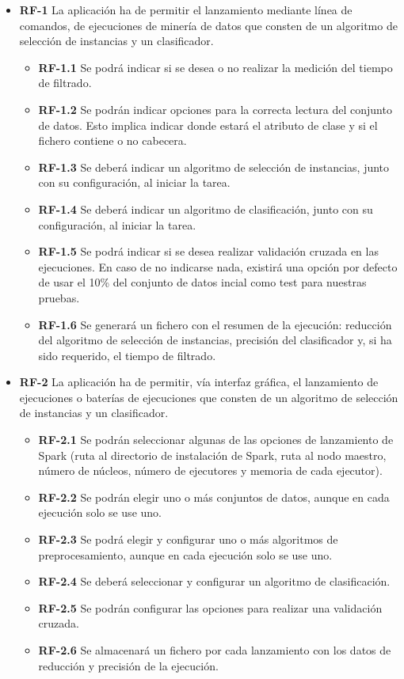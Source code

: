 \begin{itemize}

\item \textbf{RF-1} La aplicación ha de permitir el lanzamiento mediante línea de comandos, de ejecuciones de minería de datos que consten de un algoritmo de selección de instancias y un clasificador.
	\begin{itemize}
		\item \textbf{RF-1.1} Se podrá indicar si se desea o no realizar la medición del tiempo de filtrado.
		\item \textbf{RF-1.2} Se podrán indicar opciones para la correcta lectura del conjunto de datos. Esto implica indicar donde estará el atributo de clase y si el fichero contiene o no cabecera.
		\item \textbf{RF-1.3} Se deberá indicar un algoritmo de selección de instancias, junto con su configuración, al iniciar la tarea.
		\item \textbf{RF-1.4} Se deberá indicar un algoritmo de clasificación, junto con su configuración, al iniciar la tarea.
		\item \textbf{RF-1.5} Se podrá indicar si se desea realizar validación cruzada en las ejecuciones. En caso de no indicarse nada, existirá una opción por defecto de usar el 10\% del conjunto de datos incial como test para nuestras pruebas.
		\item \textbf{RF-1.6} Se generará un fichero con el resumen de la ejecución: reducción del algoritmo de selección de instancias, precisión del clasificador y, si ha sido requerido, el tiempo de filtrado.
	\end{itemize}

\item \textbf{RF-2} La aplicación ha de permitir, vía interfaz gráfica, el lanzamiento de ejecuciones o baterías de ejecuciones que consten de un algoritmo de selección de instancias y un clasificador.
	\begin{itemize}
		\item \textbf{RF-2.1} Se podrán seleccionar algunas de las opciones de lanzamiento de Spark (ruta al directorio de instalación de Spark, ruta al nodo maestro, número de núcleos, número de ejecutores y memoria de cada ejecutor).
		\item \textbf{RF-2.2} Se podrán elegir uno o más conjuntos de datos, aunque en cada ejecución solo se use uno.
		\item \textbf{RF-2.3} Se podrá elegir y configurar uno o más algoritmos de preprocesamiento, aunque en cada ejecución solo se use uno.
		\item \textbf{RF-2.4} Se deberá seleccionar y configurar un algoritmo de clasificación.
		\item \textbf{RF-2.5} Se podrán configurar las opciones para realizar una validación cruzada.
		\item \textbf{RF-2.6} Se almacenará un fichero por cada lanzamiento con los datos de reducción y precisión de la ejecución.
	\end{itemize}


\end{itemize}
